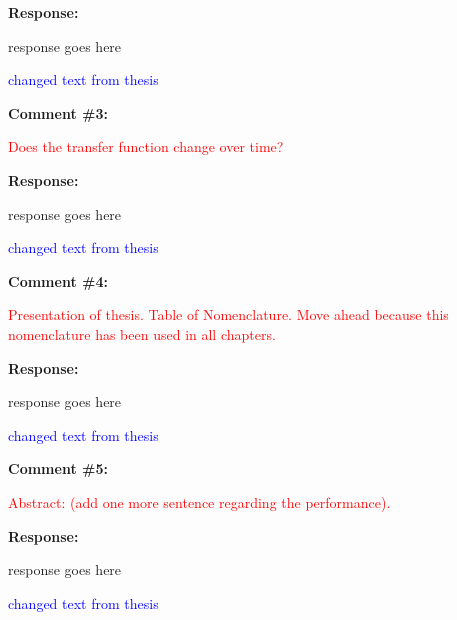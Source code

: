 \documentclass[journal]{IEEEtran}
\begin{document}
\vspace{10pt}
\textbf{Response:}
\begin{adjustwidth}{2.5em}{0pt}
response goes here

\vspace{10pt}
\noindent\textcolor{blue}{changed text from thesis}
\end{adjustwidth}


\vspace{30pt}
\textbf{Comment \#3:}
\begin{adjustwidth}{2.5em}{0pt}
\singlespacing \vspace{-10pt}
\textcolor{red}{Does the transfer function change over time? }
\end{adjustwidth}

\vspace{10pt}
\textbf{Response:}
\begin{adjustwidth}{2.5em}{0pt}
response goes here

\vspace{10pt}
\noindent\textcolor{blue}{changed text from thesis}
\end{adjustwidth}


\vspace{30pt}
\textbf{Comment \#4:}
\begin{adjustwidth}{2.5em}{0pt}
\singlespacing \vspace{-10pt}
\textcolor{red}{Presentation of thesis. Table of Nomenclature. Move ahead because this nomenclature has been used in all chapters.}
\end{adjustwidth}

\vspace{10pt}
\textbf{Response:}
\begin{adjustwidth}{2.5em}{0pt}
response goes here

\vspace{10pt}
\noindent\textcolor{blue}{changed text from thesis}
\end{adjustwidth}


\vspace{30pt}
\textbf{Comment \#5:}
\begin{adjustwidth}{2.5em}{0pt}
\singlespacing \vspace{-10pt}
\textcolor{red}{Abstract: (add one more sentence regarding the performance).}
\end{adjustwidth}

\vspace{10pt}
\textbf{Response:}
\begin{adjustwidth}{2.5em}{0pt}
response goes here

\vspace{10pt}
\noindent\textcolor{blue}{changed text from thesis}
\end{adjustwidth}
\end{document}
